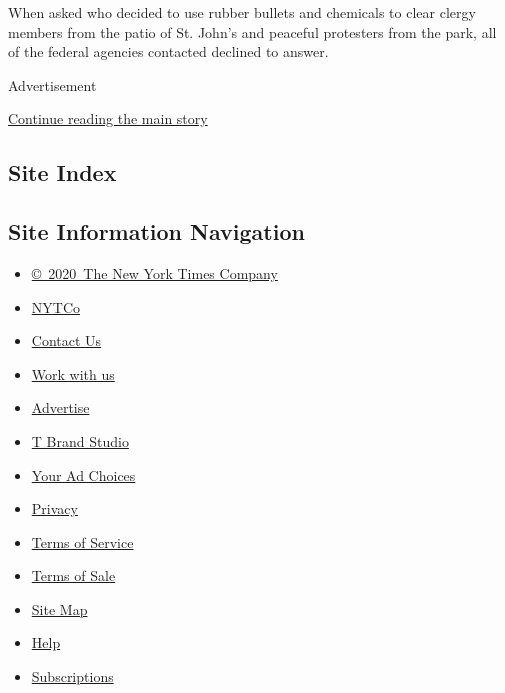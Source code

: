 When asked who decided to use rubber bullets and chemicals to clear
clergy members from the patio of St. John's and peaceful protesters from
the park, all of the federal agencies contacted declined to answer.

Advertisement

\protect\hyperlink{after-bottom}{Continue reading the main story}

\hypertarget{site-index}{%
\subsection{Site Index}\label{site-index}}

\hypertarget{site-information-navigation}{%
\subsection{Site Information
Navigation}\label{site-information-navigation}}

\begin{itemize}
\tightlist
\item
  \href{https://help.nytimes.com/hc/en-us/articles/115014792127-Copyright-notice}{©~2020~The
  New York Times Company}
\end{itemize}

\begin{itemize}
\tightlist
\item
  \href{https://www.nytco.com/}{NYTCo}
\item
  \href{https://help.nytimes.com/hc/en-us/articles/115015385887-Contact-Us}{Contact
  Us}
\item
  \href{https://www.nytco.com/careers/}{Work with us}
\item
  \href{https://nytmediakit.com/}{Advertise}
\item
  \href{http://www.tbrandstudio.com/}{T Brand Studio}
\item
  \href{https://www.nytimes.com/privacy/cookie-policy\#how-do-i-manage-trackers}{Your
  Ad Choices}
\item
  \href{https://www.nytimes.com/privacy}{Privacy}
\item
  \href{https://help.nytimes.com/hc/en-us/articles/115014893428-Terms-of-service}{Terms
  of Service}
\item
  \href{https://help.nytimes.com/hc/en-us/articles/115014893968-Terms-of-sale}{Terms
  of Sale}
\item
  \href{https://spiderbites.nytimes.com}{Site Map}
\item
  \href{https://help.nytimes.com/hc/en-us}{Help}
\item
  \href{https://www.nytimes.com/subscription?campaignId=37WXW}{Subscriptions}
\end{itemize}
